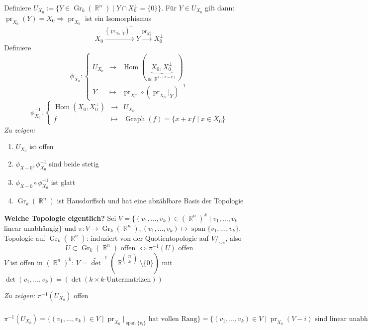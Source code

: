 \documentclass[paper=A4, twoside, chapterprefix=true, bibliography=totoc, headsepline]{scrbook}
\let\temp\phi{}
\let\phi\varphi{}
\let\varphi\temp{}
\let\temp\theta{}
\let\theta\vartheta{}
\let\vartheta\temp{}
\let\temp\epsilon{}
\let\epsilon\varepsilon{}
\let\varepsilon\temp{}
\let\temp\rho{}
\let\rho\varrho{}
\let\varrho\temp{}
\DeclareMathOperator{\R}{\mathbb{R}}
\DeclareMathOperator{\mspan}{span}  %
\DeclareMathOperator{\pr}{pr}
\DeclareMathOperator{\Gr}{Gr}
\DeclareMathOperator{\Graph}{Graph}
\DeclareMathOperator{\Hom}{Hom}     %
\newcommand{\modulo}[1]{\ensuremath{/_{\displaystyle #1}}}
\theoremstyle{plain}
\theoremstyle{nonumberplain}
\theoremstyle{empty}
\theoremstyle{break}
\begin{document}
Definiere $U_{X_0} := \{Y \in \Gr_k(\R^n) \mid Y \cap X_0^\perp = \{0\}\}$. F\"ur $Y \in U_{X_0}$ gilt dann: $\pr_{X_0}(Y) = X_0 \Rightarrow \pr_{X_0}$ ist ein Isomorphismus
	\[X_0 \xrightarrow{(\pr_{X_0}|_Y)^{-1}} Y \xrightarrow{\pr_{X_0^\perp}} X_0^\perp \]
Definiere
	\[ \varphi_{X_0}: \left\{\begin{array}{ccl} U_{X_0} &\to& \Hom(\underbrace{X_0, X_0^\perp}_{\cong \R^{k \cdot (n-k)}}) \\
		Y &\mapsto& \pr_{X_0^\perp} \circ (\pr_{X_0}|_Y)^{-1} \end{array}\right.\]
	\[ \varphi_{X_0}^{-1}: \left\{\begin{array}{ccl} \Hom(X_0, X_0^\perp) &\to& U_{X_0} \\
		f &\mapsto& \Graph(f) = \{x + xf \mid x \in X_0\} \end{array}\right.\]
\emph{Zu zeigen:}\begin{enumerate}
\item
	$U_{X_0}$ ist offen
\item
	$\varphi_{X-0}, \varphi_{X_0}^{-1}$ sind beide stetig
\item
	$\varphi_{X-0} \circ \varphi_{X_0}^{-1}$ ist glatt
\item
	$\Gr_k(\R^n)$ ist Hausdorffsch und hat eine abz\"ahlbare Basis der Topologie
\end{enumerate}

\textbf{Welche Topologie eigentlich?} Sei $V = \{ (v_1,\ldots, v_k) \in (\R^n)^k \mid v_1,\ldots, v_k$ linear unabh\"angig$\}$ und $\pi: V \to \Gr_k(\R^n), (v_1,\ldots ,v_k) \mapsto \mspan\{v_1,\ldots ,v_k\}$. Topologie auf $\Gr_k(\R^n)$: induziert von der Quotientopologie auf $V\modulo{\sim\pi}$, also
	\[U \subset \Gr_k(\R^n) \text{ offen } \Leftrightarrow \pi^{-1}(U) \text{ offen} \]
$V$ ist offen in $(\R^n)^k$: $V = \widetilde{\det}^{-1}(\R^{\left(\begin{smallmatrix}n \\ k\end{smallmatrix}\right)} \setminus \{0\})$ mit $\widetilde{\det}(v_1,\ldots,v_k) = (\det(k \times k\text{-Untermatrizen}))$

\emph{Zu zeigen:} $\pi^{-1}(U_{X_0})$ offen

$\pi^{-1}(U_{X_0}) = \{(v_1,\ldots ,v_k) \in V \mid \pr_{X_0}|_{\mspan\{v_i\}} \text{ hat vollen Rang}\} = \{(v_1,\ldots ,v_k) \in V \mid \pr_{X_0}(V-i) \text{ sind linear unabh\"angig} \} = (\widetilde{\det} \circ (\pr_{X_0},\ldots ,\pr_{X_0}))^{-1}(\R^{\left(\begin{smallmatrix}n \\ k\end{smallmatrix}\right)} \setminus \{0\})$
\end{document}
